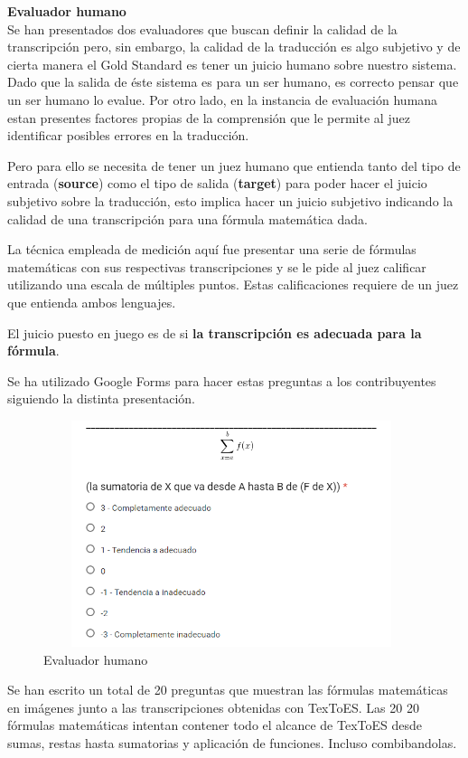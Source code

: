 {\Large \textbf{Evaluador humano}}\\

Se han presentados dos evaluadores que buscan definir la calidad de la transcripción pero, sin embargo, la calidad de la traducción es algo subjetivo y de cierta manera el Gold Standard es tener un juicio humano sobre nuestro sistema. Dado que la salida de éste sistema es para un ser humano, es correcto pensar que un ser humano lo evalue. Por otro lado, en la instancia de evaluación humana estan presentes factores propias de la comprensión que le permite al juez identificar posibles errores en la traducción.

Pero para ello se necesita de tener un juez humano que entienda tanto del tipo de entrada (\textbf{source}) como el tipo de salida (\textbf{target}) para poder hacer el juicio subjetivo sobre la traducción, esto implica hacer un juicio subjetivo indicando la calidad de una transcripción para una fórmula matemática dada.

La técnica empleada de medición aquí fue presentar una serie de fórmulas matemáticas con sus respectivas transcripciones y se le pide al juez calificar utilizando una escala de múltiples puntos. Estas calificaciones requiere de un juez que entienda ambos lenguajes.

El juicio puesto en juego es de si \textbf{la transcripción es adecuada para la fórmula}.

Se ha utilizado Google Forms para hacer estas preguntas a los contribuyentes siguiendo la distinta presentación.

\begin{figure}[H]
\centering
	\includegraphics[width=11cm, height=6.62cm]{Figures/evaluadorhumano}
	\caption[]{Evaluador humano}
\label{fig:evaluadorhumano}
\end{figure}

Se han escrito un total de 20 preguntas que muestran las fórmulas matemáticas en imágenes junto a las transcripciones obtenidas con TexToES. Las 20 20 fórmulas matemáticas intentan contener todo el alcance de TexToES desde sumas, restas hasta sumatorias y aplicación de funciones. Incluso combibandolas.

